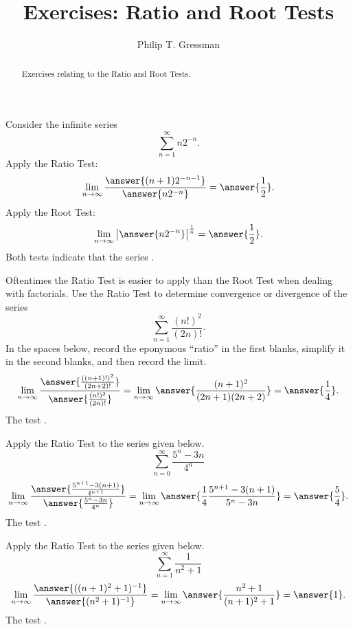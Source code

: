 \documentclass{ximera}
\title{Exercises: Ratio and Root Tests}
\author{Philip T. Gressman}
\begin{document}
\begin{abstract}
Exercises relating to the Ratio and Root Tests.
\end{abstract}
\maketitle


\begin{exercise}
Consider the infinite series
\[ \sum_{n=1}^\infty n 2^{-n}. \]
Apply the Ratio Test:
\[ \lim_{n \rightarrow \infty} \frac{\answer{(n+1) 2^{-n-1}}}{\answer{n 2^{-n}}} = \answer{\frac{1}{2}}. \]
Apply the Root Test:
\[ \lim_{n \rightarrow \infty} \left| \answer{n 2^{-n}} \right|^{\frac{1}{n}} = \answer{\frac{1}{2}}. \]
Both tests indicate that the series .
\end{exercise}

\begin{exercise}
Oftentimes the Ratio Test is easier to apply than the Root Test when dealing with factorials. Use the Ratio Test to determine convergence or divergence of the series
\[ \sum_{n=1}^\infty \frac{(n!)^2}{(2n)!}. \]
In the spaces below, record the eponymous ``ratio'' in the first blanks, simplify it in the second blanks, and then record the limit.
\[ \lim_{n \rightarrow \infty} \frac{\answer{\frac{((n+1)!)^2}{(2n+2)!}}}{\answer{\frac{(n!)^2}{(2n)!}}} = \lim_{n \rightarrow \infty} \answer{\frac{(n+1)^2}{(2n+1)(2n+2)}} = \answer{\frac{1}{4}}. \]
The test .
\end{exercise}

\begin{exercise}%
Apply the Ratio Test to the series given below.
\[ \sum_{n=0}^\infty \frac{5^n-3n}{4^n} \]
\[ \lim_{n \rightarrow \infty} \frac{\answer{\frac{5^{n+1}-3(n+1)}{4^{n+1}}}}{\answer{\frac{5^n-3n}{4^n}}} = \lim_{n \rightarrow \infty} \answer{\frac{1}{4} \frac{5^{n+1} - 3(n+1)}{5^n - 3n}} = \answer{\frac{5}{4}}. \]
The test .
\end{exercise}

\begin{exercise}
Apply the Ratio Test to the series given below.
\[ \sum_{n=1}^\infty \frac{1}{n^2+1} \]
\[ \lim_{n \rightarrow \infty} \frac{\answer{((n+1)^2+1)^{-1}}}{\answer{(n^2+1)^{-1}}} = \lim_{n \rightarrow \infty} \answer{\frac{n^2+1}{(n+1)^2+1}} = \answer{1}. \]
The test .
\end{exercise}
\end{document}
